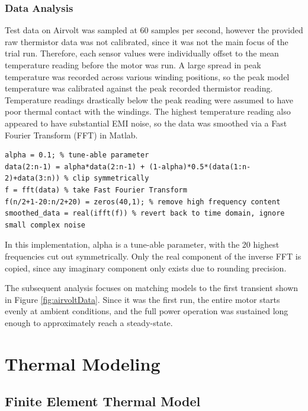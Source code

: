 \documentclass[]{aiaa-tc}%
\begin{document}
\subsubsection{Data Analysis}

Test data on Airvolt was sampled at 60 samples per second, however the provided raw thermistor data was not calibrated, since it was not the main focus of the trial run. Therefore, each sensor values were individually offset to the mean temperature reading before the motor was run. A large spread in peak temperature was recorded across various winding positions, so the peak model temperature was calibrated against the peak recorded thermistor reading. Temperature readings drastically below the peak reading were assumed to have poor thermal contact with the windings. The highest temperature reading also appeared to have substantial EMI noise, so the data was smoothed via a Fast Fourier Transform (FFT) in Matlab.

\begin{verbatim}
alpha = 0.1; % tune-able parameter 
data(2:n-1) = alpha*data(2:n-1) + (1-alpha)*0.5*(data(1:n-2)+data(3:n)) % clip symmetrically
f = fft(data) % take Fast Fourier Transform
f(n/2+1-20:n/2+20) = zeros(40,1); % remove high frequency content
smoothed_data = real(ifft(f)) % revert back to time domain, ignore small complex noise
\end{verbatim}

In this implementation, alpha is a tune-able parameter, with the 20 highest frequencies cut out symmetrically. Only the real component of the inverse FFT is copied, since any imaginary component only exists due to rounding precision.

The subsequent analysis focuses on matching models to the first transient shown in Figure \ref{fig:airvoltData}. Since it was the first run, the entire motor starts evenly at ambient conditions, and the full power operation was sustained long enough to approximately reach a steady-state.

\section{Thermal Modeling}

\subsection{Finite Element Thermal Model}
\end{document}

